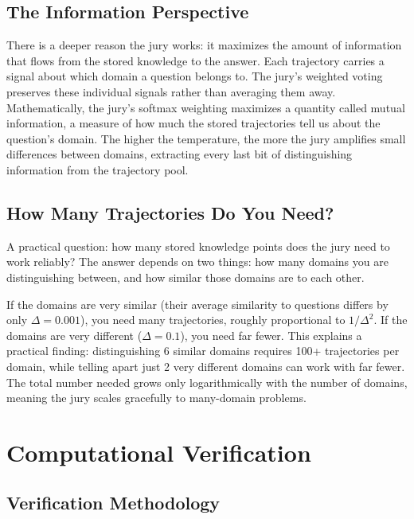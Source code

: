 \documentclass[11pt]{article}
\begin{document}
\subsection{The Information Perspective}

There is a deeper reason the jury works: it maximizes the amount of
information that flows from the stored knowledge to the answer. Each
trajectory carries a signal about which domain a question belongs to.
The jury's weighted voting preserves these individual signals rather than
averaging them away. Mathematically, the jury's softmax weighting maximizes
a quantity called mutual information, a measure of how much the
stored trajectories tell us about the question's domain. The higher the
temperature, the more the jury amplifies small differences between domains,
extracting every last bit of distinguishing information from the trajectory
pool.

\subsection{How Many Trajectories Do You Need?}

A practical question: how many stored knowledge points does the jury need to
work reliably? The answer depends on two things: how many domains you are
distinguishing between, and how similar those domains are to each other.

If the domains are very similar (their average similarity to questions differs
by only $\Delta = 0.001$), you need many trajectories, roughly proportional
to $1/\Delta^2$. If the domains are very different ($\Delta = 0.1$), you need
far fewer. This explains a practical finding: distinguishing 6 similar domains
requires 100+ trajectories per domain, while telling apart just 2 very
different domains can work with far fewer. The total number needed grows only
logarithmically with the number of domains, meaning the jury scales gracefully
to many-domain problems.

\newpage
\section{Computational Verification}

\subsection{Verification Methodology}
\end{document}
